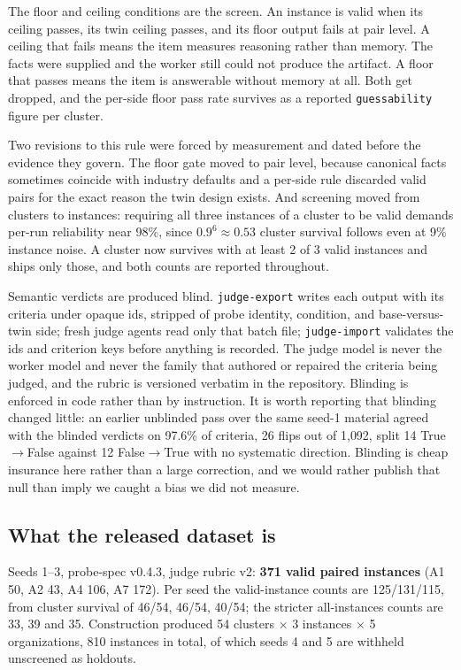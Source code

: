 \documentclass[11pt]{article}
\newcommand{\code}[1]{\texttt{\small #1}}
\begin{document}
The floor and ceiling conditions are the
screen. An instance is valid when its ceiling passes, its twin ceiling passes,
and its floor output fails at pair level. A ceiling that fails means the item
measures reasoning rather than memory. The facts were supplied and the worker
still could not produce the artifact. A floor that passes means the item is
answerable without memory at all. Both get dropped, and the per-side floor pass
rate survives as a reported \code{guessability} figure per cluster.

Two revisions to this rule were forced by measurement and dated before the
evidence they govern. The floor gate moved to pair level, because canonical
facts sometimes coincide with industry defaults and a per-side rule discarded
valid pairs for the exact reason the twin design exists. And screening moved
from clusters to instances: requiring all three instances of a cluster to be
valid demands per-run reliability near 98\%, since $0.9^6 \approx 0.53$ cluster
survival follows even at 9\% instance noise. A cluster now survives with at
least 2 of 3 valid instances and ships only those, and both counts are reported
throughout.

Semantic verdicts are produced blind. \code{judge-export} writes each output with
its criteria under opaque ids, stripped of probe identity, condition, and
base-versus-twin side; fresh judge agents read only that batch file;
\code{judge-import} validates the ids and criterion keys before anything is
recorded. The judge model is never the worker model and never the family that
authored or repaired the criteria being judged, and the rubric is versioned
verbatim in the repository. Blinding is enforced in code rather than by
instruction. It is worth reporting that blinding changed little: an earlier
unblinded pass over the same seed-1 material agreed with the blinded verdicts on
97.6\% of criteria, 26 flips out of 1{,}092, split 14 True$\rightarrow$False
against 12 False$\rightarrow$True with no systematic direction. Blinding is cheap
insurance here rather than a large correction, and we would rather publish that
null than imply we caught a bias we did not measure.

\subsection{What the released dataset is}

Seeds 1--3, probe-spec v0.4.3, judge rubric v2: \textbf{371 valid paired
instances} (A1 50, A2 43, A4 106, A7 172). Per seed the valid-instance counts are
125/131/115, from cluster survival of 46/54, 46/54, 40/54; the stricter
all-instances counts are 33, 39 and 35. Construction produced 54 clusters
$\times$ 3 instances $\times$ 5 organizations, 810 instances in total, of which
seeds 4 and 5 are withheld unscreened as holdouts.
\end{document}
